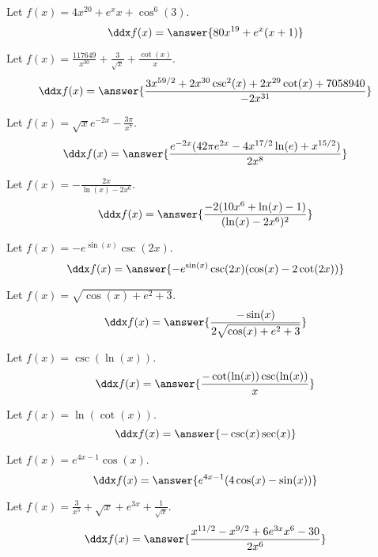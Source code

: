 \documentclass{ximera}
\begin{document}
\begin{shuffle}
\begin{exercise}
Let $f(x)=4 x^{20}+e^x x+\cos ^6(3)$.
\[
\ddx f(x) = \answer{80 x^{19}+e^x (x+1)}
\]
\end{exercise}

\begin{exercise}
Let $f(x)=\frac{117649}{x^{30}}+\frac{3}{\sqrt{x}}+\frac{\cot (x)}{x}$.
\[
\ddx f(x) = \answer{\frac{3 x^{59/2}+2 x^{30} \csc ^2(x)+2 x^{29} \cot (x)+7058940}{-2 x^{31}}}
\]
\end{exercise}

\begin{exercise}
Let $f(x)=\sqrt{x} e^{-2 x}-\frac{3 \pi }{x^7}$.
\[
\ddx f(x) = \answer{\frac{e^{-2 x} (42 \pi  e^{2 x}-4 x^{17/2} \ln (e)+x^{15/2})}{2 x^8}}
\]
\end{exercise}

\begin{exercise}
Let $f(x)=-\frac{2 x}{\ln (x)-2 x^6}$.
\[
\ddx f(x) = \answer{\frac{-2 (10 x^6+\ln (x)-1)}{(\ln (x)-2 x^6)^2}}
\]
\end{exercise}

\begin{exercise}
Let $f(x)=-e^{\sin (x)} \csc (2 x)$.
\[
\ddx f(x) = \answer{-e^{\sin (x)} \csc (2 x) (\cos (x)-2 \cot (2 x))}
\]
\end{exercise}

\begin{exercise}
Let $f(x)=\sqrt{\cos (x)+e^2+3}$.
\[
\ddx f(x) = \answer{\frac{-\sin (x)}{2 \sqrt{\cos (x)+e^2+3}}}
\]
\end{exercise}

\begin{exercise}
Let $f(x)=\csc (\ln (x))$.
\[
\ddx f(x) = \answer{\frac{-\cot (\ln (x)) \csc (\ln (x))}{x}}
\]
\end{exercise}

\begin{exercise}
Let $f(x)=\ln (\cot (x))$.
\[
\ddx f(x) = \answer{-\csc (x) \sec (x)}
\]
\end{exercise}

\begin{exercise}
Let $f(x)=e^{4 x-1} \cos (x)$.
\[
\ddx f(x) = \answer{e^{4 x-1} (4 \cos (x)-\sin (x))}
\]
\end{exercise}

\begin{exercise}
Let $f(x)=\frac{3}{x^5}+\sqrt{x}+e^{3 x}+\frac{1}{\sqrt{x}}$.
\[
\ddx f(x) = \answer{\frac{x^{11/2}-x^{9/2}+6 e^{3 x} x^6-30}{2 x^6}}
\]
\end{exercise}


\end{shuffle}
\end{document}
